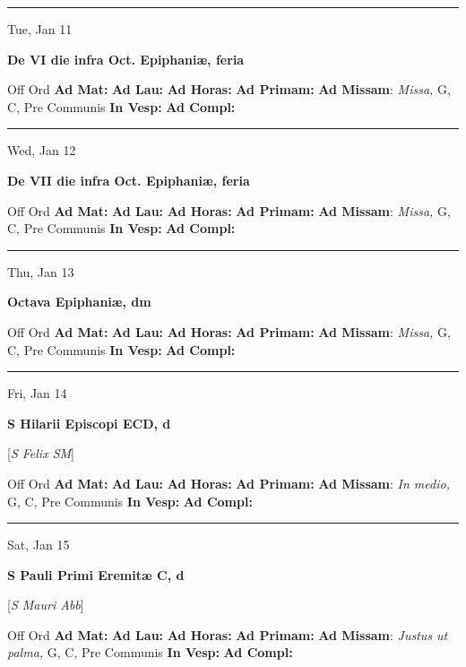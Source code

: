 \documentclass[letterpaper, 10pt]{article}
\begin{document}
\hrule
\begin{center}
Tue, Jan 11
\end{center}\textbf{ \large De VI die infra Oct. Epiphaniæ, \textnormal{\normalsize feria}}
\begin{justify}
Off Ord
\textbf{Ad Mat: }
\textbf{Ad Lau: }
\textbf{Ad Horas: }
\textbf{Ad Primam: }
\textbf{Ad Missam}: \textit{Missa,} G, C, Pre Communis
\textbf{In Vesp: }
\textbf{Ad Compl: }\end{justify}



\hrule
\begin{center}
Wed, Jan 12
\end{center}\textbf{ \large De VII die infra Oct. Epiphaniæ, \textnormal{\normalsize feria}}
\begin{justify}
Off Ord
\textbf{Ad Mat: }
\textbf{Ad Lau: }
\textbf{Ad Horas: }
\textbf{Ad Primam: }
\textbf{Ad Missam}: \textit{Missa,} G, C, Pre Communis
\textbf{In Vesp: }
\textbf{Ad Compl: }\end{justify}



\hrule
\begin{center}
Thu, Jan 13
\end{center}\textbf{ \large Octava Epiphaniæ, \textnormal{\normalsize dm}}
\begin{justify}
Off Ord
\textbf{Ad Mat: }
\textbf{Ad Lau: }
\textbf{Ad Horas: }
\textbf{Ad Primam: }
\textbf{Ad Missam}: \textit{Missa,} G, C, Pre Communis
\textbf{In Vesp: }
\textbf{Ad Compl: }\end{justify}



\hrule
\begin{center}
Fri, Jan 14
\end{center}\textbf{ \large S Hilarii Episcopi ECD, \textnormal{\normalsize d}}

[\textit{S Felix SM}]
\begin{justify}
Off Ord
\textbf{Ad Mat: }
\textbf{Ad Lau: }
\textbf{Ad Horas: }
\textbf{Ad Primam: }
\textbf{Ad Missam}: \textit{In medio,} G, C, Pre Communis
\textbf{In Vesp: }
\textbf{Ad Compl: }\end{justify}



\hrule
\begin{center}
Sat, Jan 15
\end{center}\textbf{ \large S Pauli Primi Eremitæ C, \textnormal{\normalsize d}}

[\textit{S Mauri Abb}]
\begin{justify}
Off Ord
\textbf{Ad Mat: }
\textbf{Ad Lau: }
\textbf{Ad Horas: }
\textbf{Ad Primam: }
\textbf{Ad Missam}: \textit{Justus ut palma,} G, C, Pre Communis
\textbf{In Vesp: }
\textbf{Ad Compl: }\end{justify}
\end{document}
